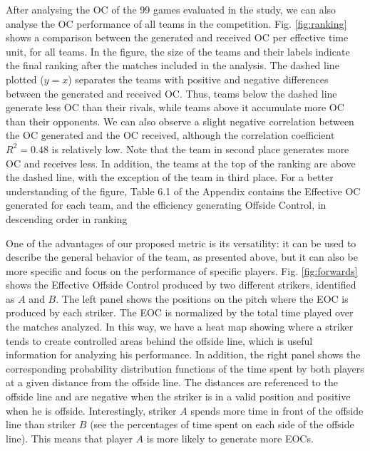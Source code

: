 \documentclass[
  10pt,
  twoside,nohyper]{book}
\begin{document}
After analysing the OC of the 99 games evaluated in the study, we can also analyse the OC performance of all teams in the competition. Fig. \ref{fig:ranking} shows a comparison between the generated and received OC per effective time unit, for all teams. In the figure, the size of the teams and their labels indicate the final ranking after the matches included in the analysis. The dashed line plotted (\(y=x\)) separates the teams with positive and negative differences between the generated and received OC. Thus, teams below the dashed line generate less OC than their rivals, while teams above it accumulate more OC than their opponents. We can also observe a slight negative correlation between the OC generated and the OC received, although the correlation coefficient \(R^2=0.48\) is relatively low. Note that the team in second place generates more OC and receives less. In addition, the teams at the top of the ranking are above the dashed line, with the exception of the team in third place. For a better understanding of the figure, Table 6.1 of the Appendix contains the Effective OC generated for each team, and the efficiency generating Offside Control, in descending order in ranking

One of the advantages of our proposed metric is its versatility: it can be used to describe the general behavior of the team, as presented above, but it can also be more specific and focus on the performance of specific players. Fig. \ref{fig:forwards} shows the Effective Offside Control produced by two different strikers, identified as \(A\) and \(B\). The left panel shows the positions on the pitch where the EOC is produced by each striker. The EOC is normalized by the total time played over the matches analyzed. In this way, we have a heat map showing where a striker tends to create controlled areas behind the offside line, which is useful information for analyzing his performance. In addition, the right panel shows the corresponding probability distribution functions of the time spent by both players at a given distance from the offside line. The distances are referenced to the offside line and are negative when the striker is in a valid position and positive when he is offside. Interestingly, striker \(A\) spends more time in front of the offside line than striker \(B\) (see the percentages of time spent on each side of the offside line). This means that player \(A\) is more likely to generate more EOCs.
\end{document}
